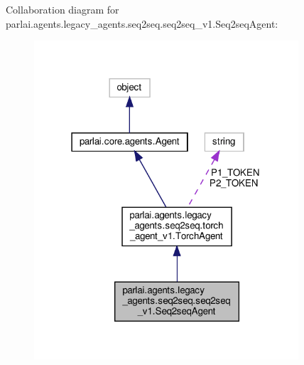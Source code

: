Collaboration diagram for parlai.\+agents.\+legacy\+\_\+agents.\+seq2seq.\+seq2seq\+\_\+v1.\+Seq2seq\+Agent\+:
\nopagebreak
\begin{figure}[H]
\begin{center}
\leavevmode
\includegraphics[width=279pt]{classparlai_1_1agents_1_1legacy__agents_1_1seq2seq_1_1seq2seq__v1_1_1Seq2seqAgent__coll__graph}
\end{center}
\end{figure}
